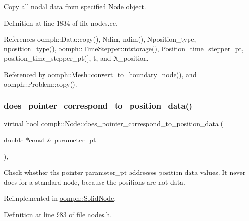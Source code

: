 Copy all nodal data from specified \hyperlink{classoomph_1_1Node}{Node} object. 



Definition at line 1834 of file nodes.\+cc.



References oomph\+::\+Data\+::copy(), Ndim, ndim(), Nposition\+\_\+type, nposition\+\_\+type(), oomph\+::\+Time\+Stepper\+::ntstorage(), Position\+\_\+time\+\_\+stepper\+\_\+pt, position\+\_\+time\+\_\+stepper\+\_\+pt(), t, and X\+\_\+position.



Referenced by oomph\+::\+Mesh\+::convert\+\_\+to\+\_\+boundary\+\_\+node(), and oomph\+::\+Problem\+::copy().

\mbox{\label{classoomph_1_1Node_ab5d4bea7ffc69a82fde5720a2a6d784c}} 
\subsubsection{\texorpdfstring{does\+\_\+pointer\+\_\+correspond\+\_\+to\+\_\+position\+\_\+data()}{does\_pointer\_correspond\_to\_position\_data()}}
{\footnotesize\ttfamily virtual bool oomph\+::\+Node\+::does\+\_\+pointer\+\_\+correspond\+\_\+to\+\_\+position\+\_\+data (\begin{DoxyParamCaption}\item[{double $\ast$const \&}]{parameter\+\_\+pt }\end{DoxyParamCaption})\hspace{0.3cm}{\ttfamily [inline]}, {\ttfamily [virtual]}}



Check whether the pointer parameter\+\_\+pt addresses position data values. It never does for a standard node, because the positions are not data. 



Reimplemented in \hyperlink{classoomph_1_1SolidNode_a33be0ea0fc6c0575d20f303b19a7d4b5}{oomph\+::\+Solid\+Node}.



Definition at line 983 of file nodes.\+h.



